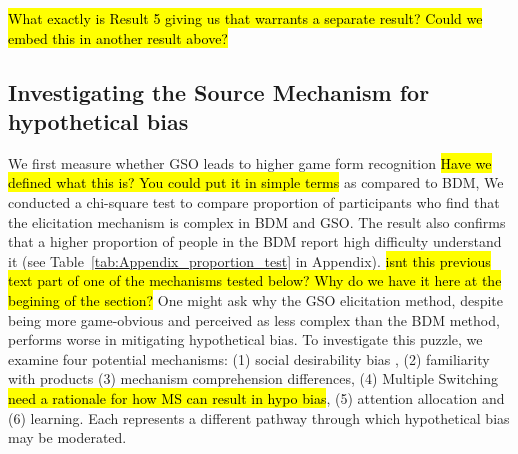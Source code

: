 \documentclass[12pt]{article}
\begin{document}
\hl{What exactly is Result 5 giving us that warrants a separate result? Could we embed this in another result above?}




            
\subsection{Investigating the Source Mechanism for hypothetical bias}

 We first measure whether GSO leads to higher game form recognition \hl{Have we defined what this is? You could put it in simple terms} as compared to BDM, We conducted a chi-square test to compare proportion of participants who find that the elicitation mechanism is complex in BDM and GSO. The result also confirms that a higher proportion of people in the BDM report high difficulty understand it (see Table~\ref{tab:Appendix_proportion_test} in Appendix). \hl{isnt this previous text part of one of the mechanisms tested below? Why do we have it here at the begining of the section?} One might ask why the GSO elicitation method, despite being more game-obvious and perceived as less complex than the BDM method, performs worse in mitigating hypothetical bias. To investigate this puzzle,  we examine four potential mechanisms: (1) social desirability bias \citep{lopez2021social, norwood2011social,bursztyn2025social}, (2) familiarity with products \citep{fox1998cvm, veettil_hypothetical_2024}  (3) mechanism comprehension differences, (4) Multiple Switching \hl{need a rationale for how MS can result in hypo bias}, (5) attention allocation and (6) learning. Each represents a different pathway through which hypothetical bias may be moderated.
 
\end{document}
